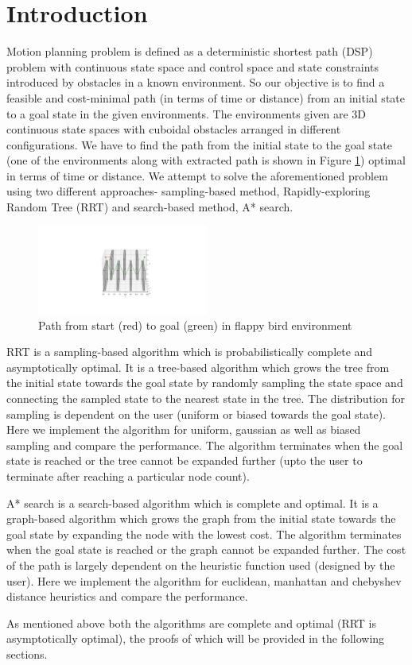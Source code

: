 \documentclass[conference]{IEEEtran}
\begin{document}
\section{Introduction}
Motion planning problem is defined as a deterministic shortest path (DSP) problem with continuous state space and control space and state constraints introduced by obstacles in a known environment. So our objective is to find 
a feasible and cost-minimal path (in terms of time or distance) from an initial state to a goal state in the given environments. The environments given are 3D 
continuous state spaces with cuboidal obstacles arranged in different configurations. We have to find the path from the initial state to the goal state (one of the environments along with extracted path is shown in Figure \ref{fig:intro}) optimal in terms of time or distance.
We attempt to solve the aforementioned problem using two different approaches- sampling-based method, Rapidly-exploring Random Tree (RRT) and search-based method, A* search.
\begin{figure}[H]
    \centering
    \includegraphics[width=0.5\textwidth]{flappy_bird_astar.png}
    \caption{Path from start (red) to goal (green) in flappy bird environment}
    \label{fig:intro}
\end{figure}
\par RRT is a sampling-based algorithm which is probabilistically complete and asymptotically optimal. It is a tree-based algorithm which grows the tree from the initial state towards the goal state by randomly sampling the state space and connecting the sampled state to the nearest state in the tree.
The distribution for sampling is dependent on the user (uniform or biased towards the goal state). Here we implement the algorithm for uniform, gaussian as well as biased sampling and compare the performance.
The algorithm terminates when the goal state is reached or the tree cannot be expanded further (upto the user to terminate after reaching a particular node count). 
\par A* search is a search-based algorithm which is complete and optimal. It is a graph-based algorithm which grows the graph from the initial state towards the goal state by expanding the node with the lowest cost.
The algorithm terminates when the goal state is reached or the graph cannot be expanded further. The cost of the path is largely dependent on the heuristic function used (designed by the user). Here we implement the algorithm for euclidean, manhattan and chebyshev distance heuristics and compare the performance.
\par As mentioned above both the algorithms are complete and optimal (RRT is asymptotically optimal), the proofs of which will be provided in the following sections.
\end{document}
